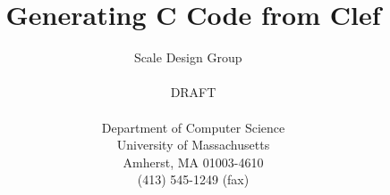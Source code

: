 \begin{singlespace}
\title{\bfseries {\Huge Generating C Code from Clef}}

\author{Scale Design Group%
  {\ }\\ 
  {\ }\\ 
  {\Large DRAFT} \\
  {\ }\\ 
  Department of Computer Science\\
  University of Massachusetts\\ Amherst, MA 01003-4610\\ (413)
  545-1249 (fax) }

\end{singlespace}
\maketitle
